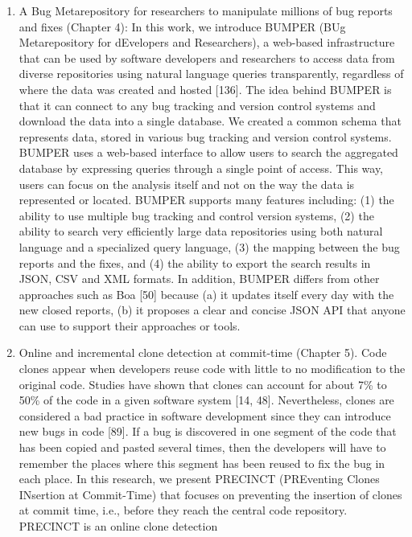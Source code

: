 \documentclass[12pt]{report}
\begin{document}
\begin{enumerate}
\def\labelenumi{\arabic{enumi}.}
\item
  A Bug Metarepository for researchers to manipulate millions of bug
  reports and fixes (Chapter 4): In this work, we introduce BUMPER (BUg
  Metarepository for dEvelopers and Researchers), a web-based
  infrastructure that can be used by software developers and researchers
  to access data from diverse repositories using natural language
  queries transparently, regardless of where the data was created and
  hosted {[}136{]}. The idea behind BUMPER is that it can connect to any
  bug tracking and version control systems and download the data into a
  single database. We created a common schema that represents data,
  stored in various bug tracking and version control systems. BUMPER
  uses a web-based interface to allow users to search the aggregated
  database by expressing queries through a single point of access. This
  way, users can focus on the analysis itself and not on the way the
  data is represented or located. BUMPER supports many features
  including: (1) the ability to use multiple bug tracking and control
  version systems, (2) the ability to search very efficiently large data
  repositories using both natural language and a specialized query
  language, (3) the mapping between the bug reports and the fixes, and
  (4) the ability to export the search results in JSON, CSV and XML
  formats. In addition, BUMPER differs from other approaches such as Boa
  {[}50{]} because (a) it updates itself every day with the new closed
  reports, (b) it proposes a clear and concise JSON API that anyone can
  use to support their approaches or tools.
\item
  Online and incremental clone detection at commit-time (Chapter 5).
  Code clones appear when developers reuse code with little to no
  modification to the original code. Studies have shown that clones can
  account for about 7\% to 50\% of the code in a given software system
  {[}14, 48{]}. Nevertheless, clones are considered a bad practice in
  software development since they can introduce new bugs in code
  {[}89{]}. If a bug is discovered in one segment of the code that has
  been copied and pasted several times, then the developers will have to
  remember the places where this segment has been reused to fix the bug
  in each place. In this research, we present PRECINCT (PREventing
  Clones INsertion at Commit-Time) that focuses on preventing the
  insertion of clones at commit time, i.e., before they reach the
  central code repository. PRECINCT is an online clone detection

\end{enumerate}
\end{document}
